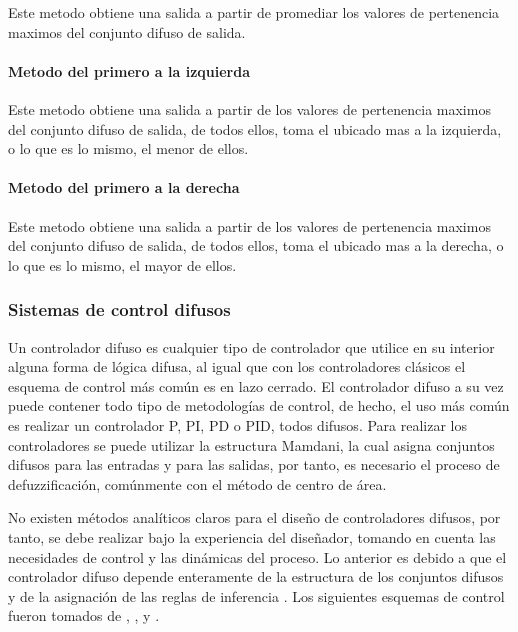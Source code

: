                 Este metodo obtiene una salida a partir de promediar los valores de pertenencia maximos del conjunto difuso de salida.

            \paragraph{Metodo del primero a la izquierda}
                
                Este metodo obtiene una salida a partir de los valores de pertenencia maximos del conjunto difuso de salida, de todos ellos, toma el ubicado mas a la izquierda, o lo que es lo mismo, el menor de ellos.
            
            \paragraph{Metodo del primero a la derecha}
                
                Este metodo obtiene una salida a partir de los valores de pertenencia maximos del conjunto difuso de salida, de todos ellos, toma el ubicado mas a la derecha, o lo que es lo mismo, el mayor de ellos.

        \subsubsection{Sistemas de control difusos}
            
            Un controlador difuso es cualquier tipo de controlador que utilice en su interior alguna forma de lógica difusa, al igual que con los controladores clásicos el esquema de control más común es en lazo cerrado. El controlador difuso a su vez puede contener todo tipo de metodologías de control, de hecho, el uso más común es realizar un controlador P, PI, PD o PID, todos difusos. Para realizar los controladores se puede utilizar la estructura Mamdani, la cual asigna conjuntos difusos para las entradas y para las salidas, por tanto, es necesario el proceso de defuzzificación, comúnmente con el método de centro de área.
            
            No existen métodos analíticos claros para el diseño de controladores difusos, por tanto, se debe realizar bajo la experiencia del diseñador, tomando en cuenta las necesidades de control y las dinámicas del proceso. Lo anterior es debido a que el controlador difuso depende enteramente de la estructura de los conjuntos difusos y de la asignación de las reglas de inferencia \Parencite{cruz2010inteligencia}. Los siguientes esquemas de control fueron tomados de \textcite{cruz2010inteligencia}, \textcite{riid2003transparent}, y \textcite{clavier2017tecnicas}.

